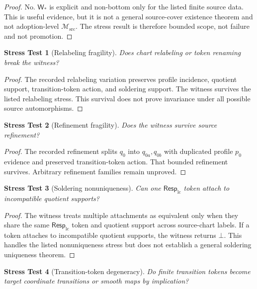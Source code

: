\documentclass[11pt]{article}
\newcommand{\RespLC}{\mathsf{Resp}_{\mathrm{lc}}}
\newcommand{\Msrc}{\mathcal{M}_{\mathrm{src}}}
\newcommand{\Bot}{\bot}
\newtheorem{stress}{Stress Test}
\begin{document}
\begin{proof}
No. \(\mathsf{W}_*\) is explicit and non-bottom only for the listed finite
source data. This is useful evidence, but it is not a general source-cover
existence theorem and not adoption-level \(\Msrc\). The stress result is
therefore bounded scope, not failure and not promotion.
\end{proof}

\begin{stress}[Relabeling fragility]
Does chart relabeling or token renaming break the witness?
\end{stress}

\begin{proof}
The recorded relabeling variation preserves profile incidence, quotient
support, transition-token action, and soldering support. The witness survives
the listed relabeling stress. This survival does not prove invariance under
all possible source automorphisms.
\end{proof}

\begin{stress}[Refinement fragility]
Does the witness survive source refinement?
\end{stress}

\begin{proof}
The recorded refinement splits \(q_0\) into \(q_{0a},q_{0b}\) with duplicated
profile \(p_0\) evidence and preserved transition-token action. That bounded
refinement survives. Arbitrary refinement families remain unproved.
\end{proof}

\begin{stress}[Soldering nonuniqueness]
Can one \(\RespLC\) token attach to incompatible quotient supports?
\end{stress}

\begin{proof}
The witness treats multiple attachments as equivalent only when they share
the same \(\RespLC\) token and quotient support across source-chart labels.
If a token attaches to incompatible quotient supports, the witness returns
\(\Bot\). This handles the listed nonuniqueness stress but does not establish
a general soldering uniqueness theorem.
\end{proof}

\begin{stress}[Transition-token degeneracy]
Do finite transition tokens become target coordinate transitions or smooth
maps by implication?
\end{stress}
\end{document}
